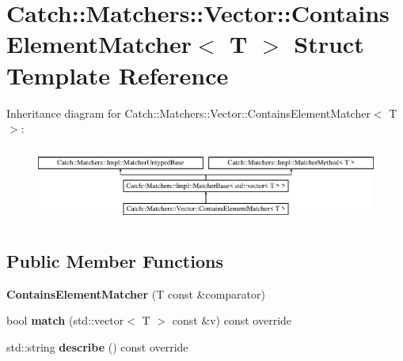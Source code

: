 \hypertarget{struct_catch_1_1_matchers_1_1_vector_1_1_contains_element_matcher}{}\section{Catch\+:\+:Matchers\+:\+:Vector\+:\+:Contains\+Element\+Matcher$<$ T $>$ Struct Template Reference}
\label{struct_catch_1_1_matchers_1_1_vector_1_1_contains_element_matcher}
Inheritance diagram for Catch\+:\+:Matchers\+:\+:Vector\+:\+:Contains\+Element\+Matcher$<$ T $>$\+:\begin{figure}[H]
\begin{center}
\leavevmode
\includegraphics[height=2.514970cm]{struct_catch_1_1_matchers_1_1_vector_1_1_contains_element_matcher}
\end{center}
\end{figure}
\subsection*{Public Member Functions}
\begin{DoxyCompactItemize}
\item 
\mbox{\label{struct_catch_1_1_matchers_1_1_vector_1_1_contains_element_matcher_a6a05740b5d3f89fac8de84ac0cff7b93}} 
{\bfseries Contains\+Element\+Matcher} (T const \&comparator)
\item 
\mbox{\label{struct_catch_1_1_matchers_1_1_vector_1_1_contains_element_matcher_a6a4be6e5642e267433d370649beb0fac}} 
bool {\bfseries match} (std\+::vector$<$ T $>$ const \&v) const override
\item 
\mbox{\label{struct_catch_1_1_matchers_1_1_vector_1_1_contains_element_matcher_aea3b674389a0afd82af6ba4b10f86ae6}} 
std\+::string {\bfseries describe} () const override
\end{DoxyCompactItemize}
